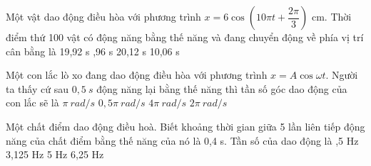 \begin{ex}%
Một vật dao động điều hòa với phương trình $x=6\cos\left(10\pi t+\dfrac{2\pi }{3} \right)$ cm. Thời điểm thứ 100 vật có động năng bằng thế năng và đang chuyển động về phía vị trí cân bằng là
\choice
{19,92 s}
{,96 s}
{20,12 s}
{10,06 s}
\end{ex} 
\begin{ex}%
Một con lắc lò xo đang dao động điều hòa với phương trình $x = A\cos\omega t$. Người ta thấy cứ sau $0,5\ s$ động năng lại bằng thế năng thì tần số góc dao động của con lắc sẽ là
\choice
{\True $\pi\ rad/s$}
{$0,5\pi\ rad/s$}
{$4\pi\ rad/s$}
{$2\pi\ rad/s$}
\end{ex} 
\begin{ex}%
Một chất điểm dao động điều hoà. Biết khoảng thời gian giữa 5 lần liên tiếp động năng của chất điểm bằng thế năng của nó là 0,4 s. Tần số của dao động là
\choice
{,5 Hz}
{3,125 Hz}
{5 Hz}
{6,25 Hz}
\end{ex} 
